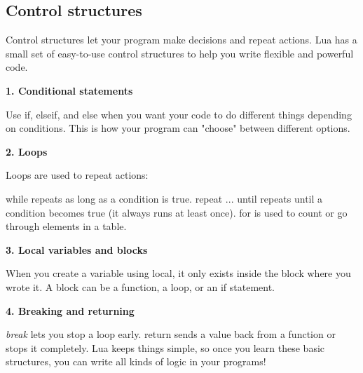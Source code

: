 %
\subsection{Control structures} %
\label{sub:control_structures}

Control structures let your program make decisions and repeat actions. Lua has a small set of easy-to-use control structures to help you write flexible and powerful code.

\textbf{1. Conditional statements}

Use if, elseif, and else when you want your code to do different things depending on conditions. This is how your program can "choose" between different options.

\textbf{2. Loops}

Loops are used to repeat actions:

while repeats as long as a condition is true.
repeat ... until repeats until a condition becomes true (it always runs at least once).
for is used to count or go through elements in a table.

\textbf{3. Local variables and blocks}

When you create a variable using local, it only exists inside the block where you wrote it. A block can be a function, a loop, or an if statement.

\textbf{4. Breaking and returning}

\emph{break} lets you stop a loop early.
return sends a value back from a function or stops it completely.
Lua keeps things simple, so once you learn these basic structures, you can write all kinds of logic in your programs!

